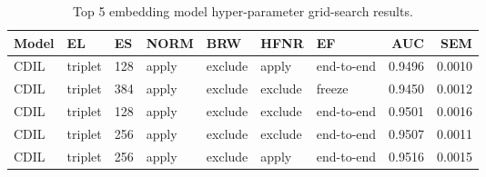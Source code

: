\documentclass[preprint,12pt]{elsarticle}
\begin{document}
\begin{landscape}
\begin{table}
    \label{tab:hpsearch-1}
\end{table}

\end{landscape}

\begin{table}[!htb]
    \footnotesize	
    \begin{subtable}{\linewidth}
      \centering
        \begin{tabular}{lllllllrr}
            \toprule
            \textbf{Model} & \textbf{EL} & \textbf{ES} & \textbf{NORM} & \textbf{BRW} & \textbf{HFNR} & \textbf{EF} & \textbf{AUC} & \textbf{SEM} \\
            \midrule
            CDIL &  triplet &            128 &      apply &                   exclude &                   apply &             end-to-end &  0.9496 &  0.0010 \\
            CDIL &  triplet &            384 &      apply &                   exclude &                  exclude &              freeze &  0.9450 &  0.0012 \\
            CDIL &  triplet &            128 &      apply &                   exclude &                  exclude &             end-to-end &  0.9501 &  0.0016 \\
            CDIL &  triplet &            256 &      apply &                   exclude &                  exclude &             end-to-end &  0.9507 &  0.0011 \\
            CDIL &  triplet &            256 &      apply &                   exclude &                   apply &             end-to-end &  0.9516 &  0.0015 \\
            \bottomrule
        \end{tabular}
        \caption{Top 5 embedding model hyper-parameter grid-search results. }
        \label{tab:gridsearch-1}
    \end{subtable}

    \bigskip
    

\end{table}
\end{document}
